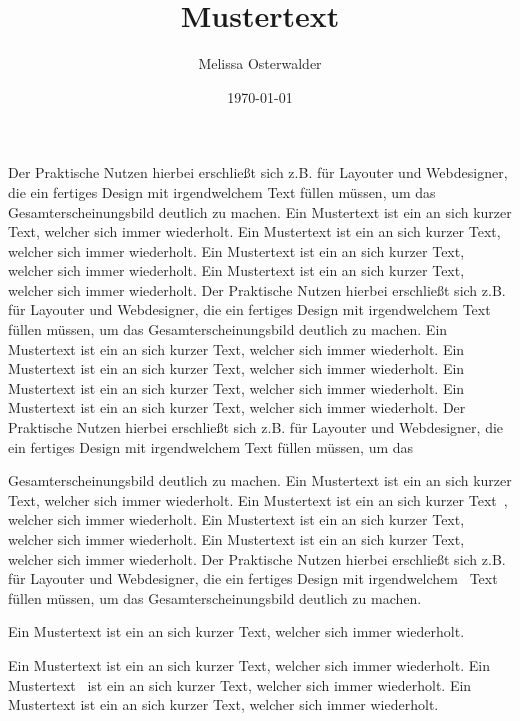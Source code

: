 \documentclass{article}
\title{Mustertext}
\date{\today}
\author{Melissa Osterwalder}
\begin{document}
\maketitle

Der Praktische Nutzen hierbei erschließt sich z.B. für Layouter und Webdesigner, die ein fertiges Design mit irgendwelchem Text füllen müssen, um das Gesamterscheinungsbild deutlich zu machen. Ein Mustertext ist ein an sich kurzer Text, welcher sich immer wiederholt. Ein Mustertext ist ein an sich kurzer Text, welcher sich immer wiederholt. Ein
Mustertext ist ein an sich kurzer Text, welcher sich immer wiederholt. Ein Mustertext ist ein an sich kurzer Text, welcher sich immer wiederholt. Der Praktische Nutzen hierbei erschließt sich z.B. für Layouter und Webdesigner, die ein fertiges Design mit irgendwelchem Text füllen müssen, um das Gesamterscheinungsbild deutlich zu machen. Ein Mustertext ist ein an sich kurzer Text, welcher sich immer wiederholt. Ein Mustertext ist ein an sich kurzer Text, welcher sich immer wiederholt. Ein Mustertext ist ein an sich kurzer Text, welcher sich immer wiederholt. Ein Mustertext ist ein an sich kurzer Text, welcher sich immer wiederholt. Der Praktische Nutzen hierbei erschließt sich z.B. für Layouter und Webdesigner, die ein fertiges Design mit irgendwelchem Text füllen müssen, um das

Gesamterscheinungsbild deutlich zu machen. Ein Mustertext ist ein an sich kurzer Text, welcher sich immer wiederholt. Ein Mustertext ist ein an sich kurzer Text~\cite{masciadri2013sozialtechnikregeln}, welcher sich immer wiederholt. Ein Mustertext ist ein an sich kurzer Text, welcher sich immer wiederholt. Ein Mustertext ist ein an sich kurzer Text, welcher sich immer wiederholt. Der Praktische Nutzen hierbei erschließt sich z.B. für Layouter und Webdesigner, die ein fertiges Design mit irgendwelchem~\cite{geschonneck2004computer} Text füllen müssen, um das Gesamterscheinungsbild deutlich zu machen.

\begin{center}
    Ein Mustertext
    ist ein an
    sich kurzer
    Text,
    welcher
	sich immer wiederholt.
\end{center}
Ein Mustertext ist ein an sich kurzer Text, welcher sich immer wiederholt. Ein Mustertext~\cite{enders2014darm} ist ein an sich kurzer Text, welcher sich immer wiederholt. Ein Mustertext ist ein an sich kurzer Text, welcher sich immer wiederholt. 



\end{document}
